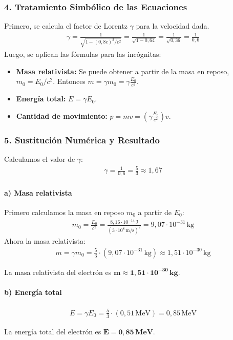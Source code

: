 \subsubsection*{4. Tratamiento Simbólico de las Ecuaciones}
Primero, se calcula el factor de Lorentz $\gamma$ para la velocidad dada.
\begin{gather}
    \gamma = \frac{1}{\sqrt{1 - (0,8c)^2/c^2}} = \frac{1}{\sqrt{1 - 0,64}} = \frac{1}{\sqrt{0,36}} = \frac{1}{0,6}
\end{gather}
Luego, se aplican las fórmulas para las incógnitas:
\begin{itemize}
    \item \textbf{Masa relativista:} Se puede obtener a partir de la masa en reposo, $m_0 = E_0/c^2$. Entonces $m = \gamma m_0 = \gamma \frac{E_0}{c^2}$.
    \item \textbf{Energía total:} $E = \gamma E_0$.
    \item \textbf{Cantidad de movimiento:} $p = m v = \left(\gamma \frac{E_0}{c^2}\right) v$.
\end{itemize}

\subsubsection*{5. Sustitución Numérica y Resultado}
Calculamos el valor de $\gamma$:
\begin{gather}
    \gamma = \frac{1}{0,6} = \frac{5}{3} \approx 1,67
\end{gather}
\paragraph{a) Masa relativista}
Primero calculamos la masa en reposo $m_0$ a partir de $E_0$:
\begin{gather}
    m_0 = \frac{E_0}{c^2} = \frac{8,16 \cdot 10^{-14} \, \text{J}}{(3 \cdot 10^8 \, \text{m/s})^2} = 9,07 \cdot 10^{-31} \, \text{kg}
\end{gather}
Ahora la masa relativista:
\begin{gather}
    m = \gamma m_0 = \frac{5}{3} \cdot (9,07 \cdot 10^{-31} \, \text{kg}) \approx 1,51 \cdot 10^{-30} \, \text{kg}
\end{gather}
\begin{cajaresultado}
    La masa relativista del electrón es $\boldsymbol{m \approx 1,51 \cdot 10^{-30} \, \textbf{kg}}$.
\end{cajaresultado}

\paragraph{b) Energía total}
\begin{gather}
    E = \gamma E_0 = \frac{5}{3} \cdot (0,51 \, \text{MeV}) = 0,85 \, \text{MeV}
\end{gather}
\begin{cajaresultado}
    La energía total del electrón es $\boldsymbol{E = 0,85 \, \textbf{MeV}}$.
\end{cajaresultado}

